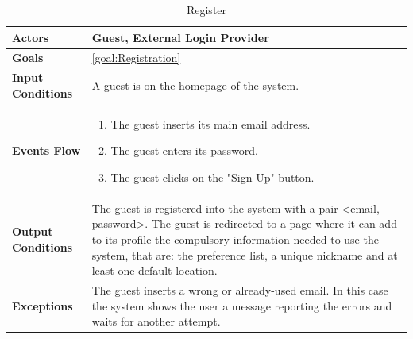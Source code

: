 \begin{table}[H]	
	\centering
	\def\arraystretch{1.5}
	\begin{tabular}{|m{7cm}|m{7cm}|}
		\hline
		\textbf{Actors}            & Guest, External Login Provider		    \\ \hline
		\textbf{Goals}             & \ref{goal:Registration}           \\ \hline
		\textbf{Input Conditions}  & A guest is on the homepage of the system.           \\ \hline
		\textbf{Events Flow}       &   
		\begin{enumerate}
			\item The guest inserts its main email address.
			\item The guest enters its password.
			\item The guest clicks on the "Sign Up" button.
		\end{enumerate}    \\ \hline
		\textbf{Output Conditions} & The guest is registered into the system with a pair <email, password>. The guest is redirected to a page where it can add to its profile the compulsory information needed to use the system, that are: the preference list, a unique nickname and at least one default location.      \\ \hline
		\textbf{Exceptions}        & The guest inserts a wrong or already-used email. In this case the system shows the user a message reporting the errors and waits for another attempt.            \\ \hline
	\end{tabular}
	\caption{Register\label{UseCaseDescr:Registration}}
\end{table}

